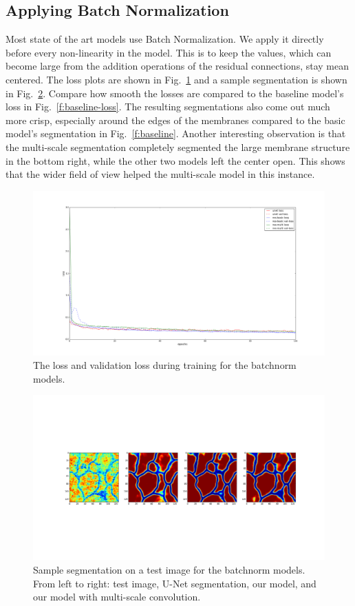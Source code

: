 \subsection{Applying Batch Normalization}
Most state of the art models use Batch Normalization. We apply it directly before every non-linearity in the model. This is to keep the values, which can become large from the addition operations of the residual connections, stay mean centered. The loss plots are shown in Fig.~\ref{f:batchnorm-loss} and a sample segmentation is shown in Fig.~\ref{f:batchnorm}. Compare how smooth the losses are compared to the baseline model's loss in Fig.~\ref{f:baseline-loss}. The resulting segmentations also come out much more crisp, especially around the edges of the membranes compared to the basic model's segmentation in Fig.~\ref{f:baseline}. Another interesting observation is that the multi-scale segmentation completely segmented the large membrane structure in the bottom right, while the other two models left the center open. This shows that the wider field of view helped the multi-scale model in this instance.

\begin{figure}[h!]
	\centering
		\includegraphics[width=1.0\textwidth]{figures/batchnorm_loss.png}
	\caption{The loss and validation loss during training for the batchnorm models.}
	\label{f:batchnorm-loss}
\end{figure}
\begin{figure}[h!]
	\centering
		\includegraphics[width=1.0\textwidth]{figures/batchnorm.png}
	\caption{Sample segmentation on a test image for the batchnorm models. From left to right: test image, U-Net segmentation, our model, and our model with multi-scale convolution.}
	\label{f:batchnorm}
\end{figure}

